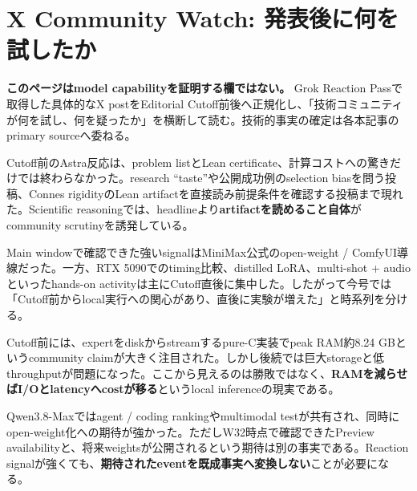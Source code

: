 \section{X Community Watch: 発表後に何を試したか}

\textbf{このページはmodel capabilityを証明する欄ではない。} Grok Reaction Passで取得した具体的なX postをEditorial Cutoff前後へ正規化し、「技術コミュニティが何を試し、何を疑ったか」を横断して読む。技術的事実の確定は各本記事のprimary sourceへ委ねる。

\begin{communitynote}
Cutoff前のAstra反応は、problem listとLean certificate、計算コストへの驚きだけでは終わらなかった。research ``taste''や公開成功例のselection biasを問う投稿、Connes rigidityのLean artifactを直接読み前提条件を確認する投稿まで現れた\cite{astra-x-deredleritt3r,astra-x-manuflog}。Scientific reasoningでは、headlineより\textbf{artifactを読めること自体}がcommunity scrutinyを誘発している。
\end{communitynote}

\begin{communitynote}
Main windowで確認できた強いsignalはMiniMax公式のopen-weight / ComfyUI導線だった\cite{minimax-h3-x-openweights}。一方、RTX 5090でのtiming比較、distilled LoRA、multi-shot + audioといったhands-on activityは主にCutoff直後に集中した\cite{h3-x-local-5090,h3-x-multishot-audio}。したがって今号では「Cutoff前からlocal実行への関心があり、直後に実験が増えた」と時系列を分ける。
\end{communitynote}

\begin{communitynote}
Cutoff前には、expertをdiskからstreamするpure-C実装でpeak RAM約8.24 GBというcommunity claimが大きく注目された\cite{kimi-k3-x-lowram}。しかし後続では巨大storageと低throughputが問題になった\cite{kimi-k3-x-practicality}。ここから見えるのは勝敗ではなく、\textbf{RAMを減らせばI/Oとlatencyへcostが移る}というlocal inferenceの現実である。
\end{communitynote}

\begin{communitynote}
Qwen3.8-Maxではagent / coding rankingやmultimodal testが共有され、同時にopen-weight化への期待が強かった\cite{qwen38-x-ranking}。ただしW32時点で確認できたPreview availabilityと、将来weightsが公開されるという期待は別の事実である。Reaction signalが強くても、\textbf{期待されたeventを既成事実へ変換しない}ことが必要になる。
\end{communitynote}

